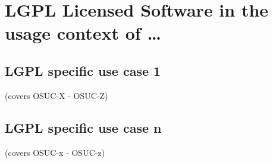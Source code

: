 %
%
%
%
%



\section{LGPL Licensed Software in the usage context of \ldots}
\label{OSUC-01-LGPL} \label{OSUC-03-LGPL} 
\label{OSUC-06-LGPL} \label{OSUC-09-LGPL}

\label{OSUC-02-LGPL} \label{OSUC-04-LGPL} \label{OSUC-05-LGPL}
\label{OSUC-07-LGPL} \label{OSUC-08-LGPL} \label{OSUC-10-LGPL}


\subsection{LGPL specific use case 1}
(covers OSUC-X - OSUC-Z)

\subsection{LGPL specific use case n}
(covers OSUC-x - OSUC-z)


%

